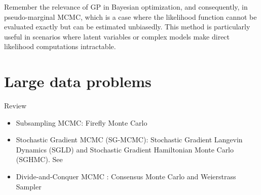 Remember the relevance of GP in Bayesian optimization, and consequently, in pseudo-marginal MCMC, which is a case where the likelihood function cannot be evaluated exactly but can be estimated unbiasedly. This method is particularly useful in scenarios where latent variables or complex models make direct likelihood computations intractable.

\section{Large data problems}\label{13_5}
Review \cite{bardenet2017markov}
\begin{itemize}
	\item Subsampling MCMC: Firefly Monte Carlo \cite{Maclaurin2015}
	\item Stochastic Gradient MCMC (SG-MCMC): Stochastic Gradient Langevin Dynamics (SGLD) and Stochastic Gradient Hamiltonian Monte Carlo (SGHMC). See \cite{nemeth2021stochastic,song2020extended,baker2019sgmcmc,chen2014stochastic,welling2011bayesian}
	\item Divide-and-Conquer MCMC \cite{quiroz2018subsampling,quiroz2019speeding}: Consensus Monte Carlo \cite{rendell2020global,scott2022bayes} and Weierstrass Sampler \cite{wu2017average}
\end{itemize}

